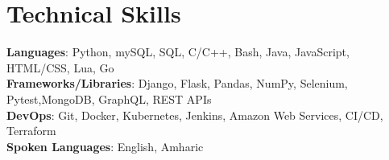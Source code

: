 \section{Technical Skills}
  \begin{itemize}[leftmargin=0.15in, label={}]
    \small{\item{
      \textbf{Languages}{: Python, mySQL, SQL, C/C++, Bash, Java, JavaScript, HTML/CSS, Lua, Go} \\
      \textbf{Frameworks/Libraries}{: Django, Flask, Pandas, NumPy, Selenium, Pytest,MongoDB, GraphQL, REST APIs} \\
      \textbf{DevOps}{: Git, Docker, Kubernetes, Jenkins, Amazon Web Services, CI/CD, Terraform} \\
      \textbf{Spoken Languages}{: English, Amharic} \\
    }}
  \end{itemize}